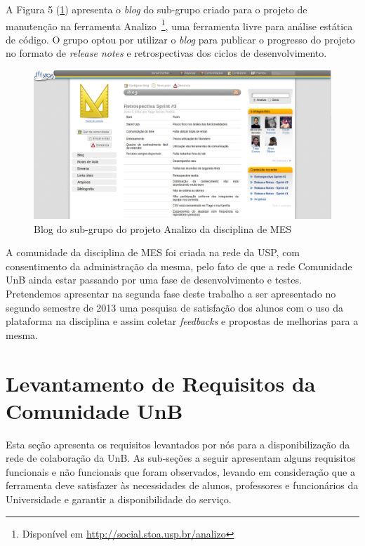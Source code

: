 A Figura 5 (\ref{analizo}) apresenta o \textit{blog} do sub-grupo
criado para o projeto de manutenção na ferramenta Analizo~\footnote{Disponível
em \url{http://social.stoa.usp.br/analizo}}, uma ferramenta livre
para análise estática de código. O grupo optou por utilizar o \textit{blog}
para publicar o progresso do projeto no formato de \textit{release notes} e
retrospectivas dos ciclos de desenvolvimento.

\begin{figure}[h]
	\centering
	\label{analizo}
		\includegraphics[keepaspectratio=true,scale=0.3]
		{figuras/analizo.eps}
	\caption{Blog do sub-grupo do projeto Analizo da disciplina de MES }
\end{figure}

A comunidade da disciplina de MES foi criada na rede da USP, com consentimento
da administração da mesma, pelo fato de que a rede Comunidade UnB ainda estar
passando por uma fase de desenvolvimento e testes. Pretendemos apresentar
na segunda fase deste trabalho a ser apresentado no segundo semestre de 2013
uma pesquisa de satisfação dos alunos com o uso da plataforma na disciplina e
assim coletar \textit{feedbacks} e propostas de melhorias para a mesma. 


\section{Levantamento de Requisitos da Comunidade UnB}
\label{requisitos}

Esta seção apresenta os requisitos levantados por nós para a disponibilização
da rede de colaboração da UnB. As sub-seções a seguir apresentam alguns
requisitos funcionais e não funcionais que foram observados, levando
em consideração que a ferramenta deve satisfazer às necessidades de alunos,
professores e funcionários da Universidade e garantir a disponibilidade do
serviço.

